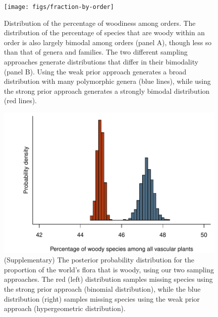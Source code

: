 \documentclass[a4paper,12pt]{article}
\begin{document}
\begin{figure}[p]
  \centering
  \texttt{[image: figs/fraction-by-order]}
  \caption{Distribution of the percentage of woodiness among orders.
    The distribution of the percentage of species that are woody within
    an order is also largely bimodal among orders (panel A), though
    less so than that of genera and families.
    The two different sampling approaches generate distributions that
    differ in their bimodality (panel B).  Using the weak prior
    approach generates a broad distribution with many polymorphic
    genera (blue lines), while using the strong prior approach
    generates a strongly bimodal distribution (red lines).}
  \label{fig:distribution-order}
\end{figure}

\begin{figure}[p]
  \centering
  \includegraphics{figs/distribution-raw}
  \caption{(Supplementary) The posterior probability distribution for
    the proportion of the world's flora that is woody, using our two
    sampling approaches.  The red (left) distribution samples missing
    species using the strong prior approach (binomial distribution),
    while the blue distribution (right) samples missing species using
    the weak prior approach (hypergeometric distribution).}
  \label{fig:distribution-raw}
\end{figure}
\end{document}
